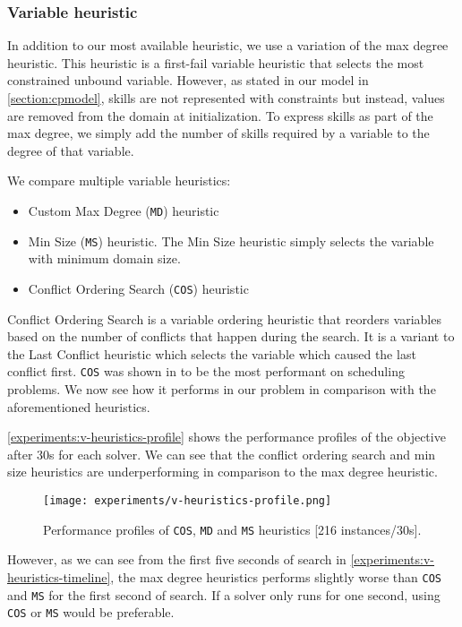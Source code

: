 \documentclass[../../thesis.tex]{subfiles}
\begin{document}
\subsubsection{Variable heuristic}

In addition to our most available heuristic, we use a variation of the max degree heuristic. 
This heuristic is a first-fail variable heuristic that selects the most constrained unbound variable. However,
as stated in our model in \autoref{section:cpmodel}, skills are not represented with constraints but instead, values 
are removed from the domain at initialization. To express skills as part of the max degree, we simply add the number of 
skills required by a variable to the degree of that variable.


We compare multiple variable heuristics:

\begin{itemize}
  \item Custom Max Degree (\texttt{MD}) heuristic
  \item Min Size (\texttt{MS}) heuristic. The Min Size heuristic simply selects the variable with minimum domain size.
  \item Conflict Ordering Search (\texttt{COS}) heuristic \cite{Gay:COS}
\end{itemize}


Conflict Ordering Search is a variable ordering heuristic that 
reorders variables based on the number of conflicts that happen during the search.
It is a variant to the Last Conflict heuristic which selects the variable which caused the last conflict first.
\texttt{COS} was shown in \cite{Gay:COS} to be the most performant on scheduling problems. 
We now see how it performs in our problem in comparison with the aforementioned heuristics.

\autoref{experiments:v-heuristics-profile} shows the performance profiles of the objective after 30s for each solver.
We can see that the conflict ordering search and min size heuristics are underperforming in comparison to the max degree heuristic.


\begin{figure}
  \centering
  \texttt{[image: experiments/v-heuristics-profile.png]}
  \caption{Performance profiles of \texttt{COS}, \texttt{MD} and \texttt{MS} heuristics [216 instances/30s].}
  \label{experiments:v-heuristics-profile}
\end{figure}

However, as we can see from the first five seconds of search in \autoref{experiments:v-heuristics-timeline}, the 
max degree heuristics performs slightly worse than \texttt{COS} and \texttt{MS} for the first second of search. If a solver only runs for 
one second, using \texttt{COS} or \texttt{MS} would be preferable.
\end{document}

